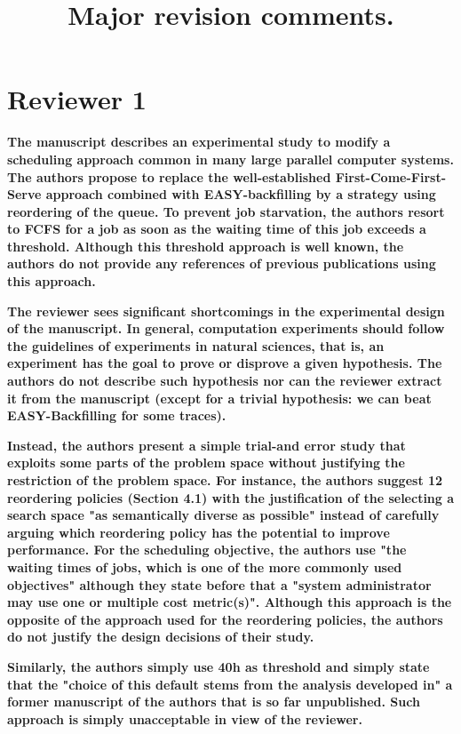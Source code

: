 \documentclass[]{article}
\title{Major revision comments.}
\begin{document}
\maketitle

\section{Reviewer 1}

\textbf{The manuscript describes an experimental study to modify a scheduling
approach common in many large parallel computer systems. The authors propose to
replace the well-established First-Come-First-Serve approach combined  with
EASY-backfilling by a strategy using reordering of the queue. To prevent job
starvation, the authors resort to FCFS for a job as soon as the waiting time of
this job exceeds a threshold. Although this threshold approach is well known,
the authors do not provide any references of previous publications using this
approach. }

\textbf{The reviewer sees significant shortcomings in the experimental design
of the manuscript. In general, computation experiments should follow the
guidelines of experiments in natural sciences, that is, an experiment has the
goal to prove or disprove a given hypothesis. The authors do not describe such
hypothesis nor can the reviewer extract it from the manuscript (except for a
trivial hypothesis: we can beat EASY-Backfilling for some traces). }

\textbf{Instead, the authors present a simple trial-and error study that
exploits some parts of the problem space without justifying the restriction of
the problem space. For instance, the authors suggest 12 reordering policies
(Section 4.1) with the justification of the selecting a search space "as
semantically diverse as possible" instead of carefully arguing which reordering
policy has the potential to improve performance. For the scheduling objective,
the authors use "the waiting times of jobs, which is one of the more commonly
used objectives" although they state before that a "system administrator may
use one or multiple cost metric(s)". Although this approach is the opposite of
the approach used for the reordering policies, the authors do not justify the
design decisions of their study. }

\textbf{Similarly, the authors simply use 40h as threshold and simply state
that the "choice of this default stems from the analysis developed in" a former
manuscript of the authors that is so far unpublished. Such approach is simply
unacceptable in view of the reviewer.}
\end{document}
